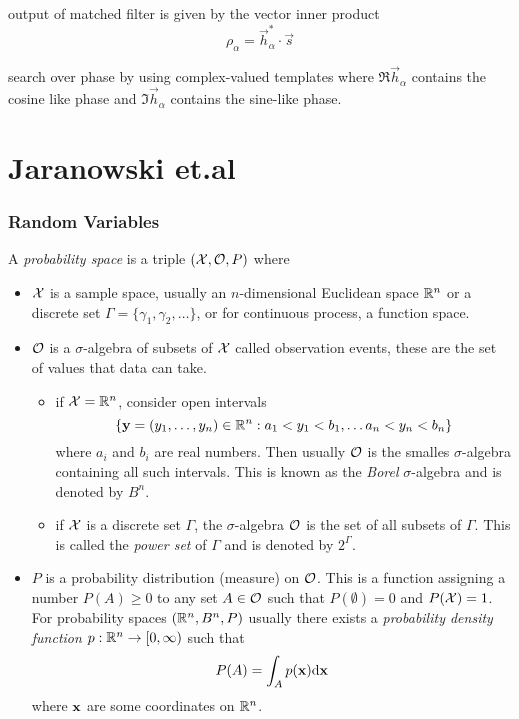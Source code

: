 output of matched filter is given by the vector inner product 
\begin{equation}
\rho_\alpha = \overrightarrow{h}_\alpha^*\cdot \overrightarrow{s}
\end{equation}

search over phase by using complex-valued templates where $\mathfrak{R}\overrightarrow{h}_\alpha$ contains the cosine like phase and $\mathfrak{I}\overrightarrow{h}_\alpha$ contains the sine-like phase. 

\section{Jaranowski et.al}

\subsubsection{Random Variables}
A \textit{probability space} is a triple $(\mathcal{X}, \mathcal{O}, P)$ where
\begin{itemize}
\item $\mathcal{X}$ is a sample space, usually an $n$-dimensional Euclidean space $\mathbb{R}^n$ or a discrete set $\Gamma=\{\gamma_1,\gamma_2, \ldots\}$, or for continuous process, a function space.
\item $\mathcal{O}$ is a $\sigma$-algebra of subsets of $\mathcal{X}$ called observation events, these are the set of values that data can take. 
\begin{itemize}
\item if $\mathcal{X}=\mathbb{R}^n$, consider open intervals 
\begin{equation}
\label{eq:openInts}
\{ {\mathbf{y}} = (y_1,\ldots, y_n)\in \mathbb{R}^n : a_1 < y_1 < b_1, \ldots a_n < y_n < b_n \}
\end{equation}
where $a_i$ and $b_i$ are real numbers. Then usually $\mathcal{O}$ is the smalles $\sigma$-algebra containing all such intervals. This is known as the \textit{Borel} $\sigma$-algebra and is denoted by $B^n$.
\item if $\mathcal{X}$ is a discrete set $\Gamma$, the $\sigma$-algebra $\mathcal{O}$ is the set of all subsets of $\Gamma$. This is called the \textit{power set} of $\Gamma$ and is denoted by $2^{\Gamma}$.
\end{itemize}
\item $P$ is a probability distribution (measure) on $\mathcal{O}$. This is a function assigning a number $P(A)\geq 0$ to any set $A\in \mathcal{O}$ such that $P(\emptyset)=0$ and $P(\mathcal{X})=1$. For probability spaces $(\mathbb{R}^n, B^n, P)$ usually there exists a \textit{probability density function} $p: \mathbb{R}^n \rightarrow [0,\infty) $ such that 
\begin{equation}
P(A)=\int_A p(\mathbf{x}) {\mbox{d}} \mathbf{x}
\end{equation}
where $\mathbf{x}$ are some coordinates on $\mathbb{R}^n$. 
\end{itemize}

